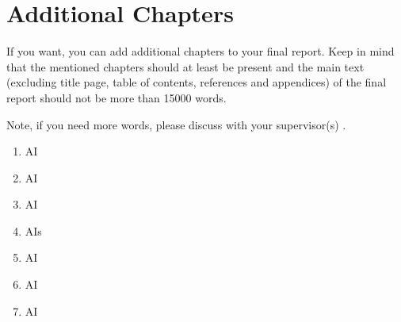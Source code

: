 \chapter{Additional Chapters}\label{chap:additional_chapters}

If you want, you can add additional chapters to your final report. Keep in mind that the mentioned chapters should at least be present and the main text (excluding title page, table of contents, references and appendices) of the final report should not be more than 15000 words.

Note, if you need more words, please discuss with your supervisor(s) \cite{ISO15066}.

\begin{enumerate}
    \item \gls{AI}
    \item \gls{AI}
    \item \Gls{AI}
    \item \glspl{AI}
    \item \acrshort{AI}
    \item \acrlong{AI}
    \item \acrfull{AI}
\end{enumerate}
